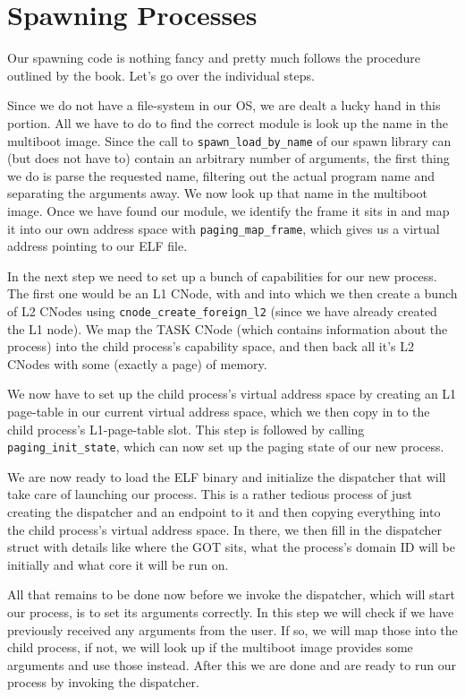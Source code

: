 \section{Spawning Processes}\label{s:spawning-processes}

Our spawning code is nothing fancy and pretty much follows the procedure 
outlined by the book. Let's go over the individual steps.
\medskip

Since we do not have a file-system in our OS, we are dealt a lucky hand in this 
portion. All we have to do to find the correct module is look up the name in 
the multiboot image. Since the call to \texttt{spawn\_load\_by\_name} of our 
spawn library can (but does not have to) contain an arbitrary number of 
arguments, the first thing we do is parse the requested name, filtering out the 
actual program name and separating the arguments away. We now look up that name 
in the multiboot image. Once we have found our module, we identify the frame it 
sits in and map it into our own address space with \texttt{paging\_map\_frame}, 
which gives us a virtual address pointing to our ELF file.
\medskip

In the next step we need to set up a bunch of capabilities for our new process. 
The first one would be an L1 CNode, with and into which we then create a bunch 
of L2 CNodes using \texttt{cnode\_create\_foreign\_l2} (since we have already 
created the L1 node). We map the TASK CNode (which contains information about 
the process) into the child process's capability space, and then back all it's 
L2 CNodes with some (exactly a page) of memory.
\medskip

We now have to set up the child process's virtual address space by creating an 
L1 page-table in our current virtual address space, which we then copy in to 
the child process's L1-page-table slot. This step is followed by calling 
\texttt{paging\_init\_state}, which can now set up the paging state of our new 
process.
\medskip

We are now ready to load the ELF binary and initialize the dispatcher that will 
take care of launching our process. This is a rather tedious process of just 
creating the dispatcher and an endpoint to it and then copying everything into 
the child process's virtual address space. In there, we then fill in the 
dispatcher struct with details like where the GOT sits, what the process's 
domain ID will be initially and what core it will be run on.
\medskip

All that remains to be done now before we invoke the dispatcher, which will 
start our process, is to set its arguments correctly. In this step we will 
check if we have previously received any arguments from the user. If so, we 
will map those into the child process, if not, we will look up if the multiboot 
image provides some arguments and use those instead. After this we are done and 
are ready to run our process by invoking the dispatcher.